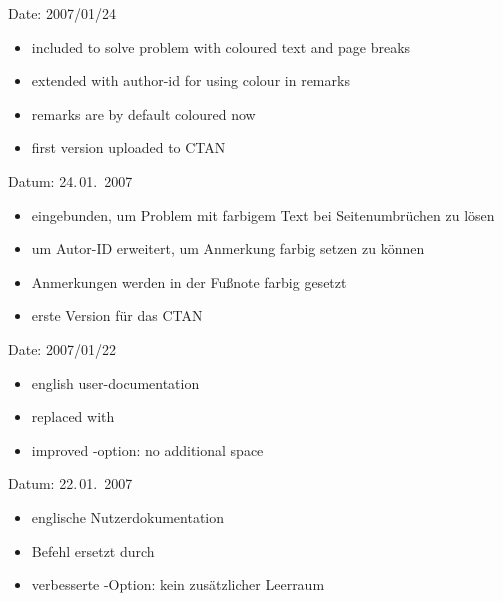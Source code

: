 
\ifENGLISH
 Date: 2007/01/24
 \begin{itemize}
	\item included  to solve problem with coloured text and page breaks
	\item extended  with author-id for using colour in remarks
	\item remarks are by default coloured now
	\item first version uploaded to CTAN
 \end{itemize}
\fi
	\ifGERMAN
	 Datum: 24.\,01.~2007
	 \begin{itemize}
		\item {} eingebunden, um Problem mit farbigem Text bei Seitenumbrüchen zu lösen
		\item {} um Autor-ID erweitert, um Anmerkung farbig setzen zu können
		\item Anmerkungen werden in der Fußnote farbig gesetzt
		\item erste Version für das CTAN
	 \end{itemize}
	\fi


\ifENGLISH
 Date: 2007/01/22
 \begin{itemize}
	\item english user-documentation
	\item replaced  with 
	\item improved -option: no additional space
 \end{itemize}
\fi
	\ifGERMAN
	 Datum: 22.\,01.~2007
	 \begin{itemize}
		\item englische Nutzerdokumentation
		\item Befehl  ersetzt durch 
		\item verbesserte -Option: kein zusätzlicher Leerraum
	 \end{itemize}
	\fi



